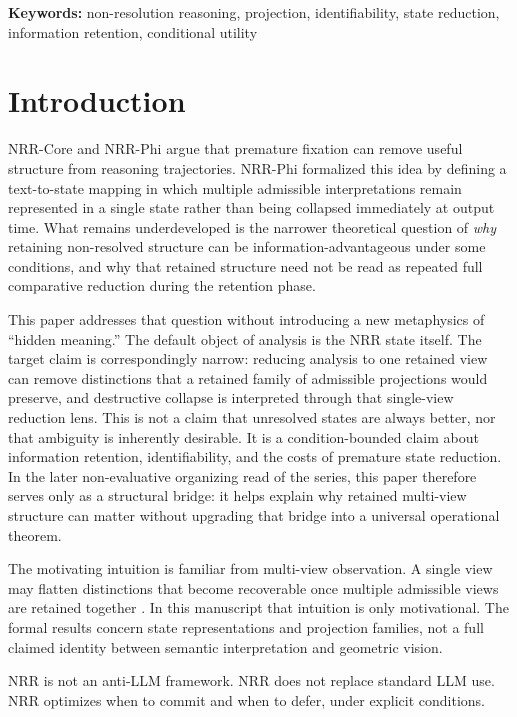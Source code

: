 \documentclass[11pt,a4paper]{article}
\begin{document}
\noindent\textbf{Keywords:} non-resolution reasoning, projection, identifiability, state reduction, information retention, conditional utility

\section{Introduction}
\label{sec:intro}

NRR-Core \cite{saito2025nrr} and NRR-Phi \cite{saito2026phi} argue that premature fixation can remove useful structure from reasoning trajectories. NRR-Phi \cite{saito2026phi} formalized this idea by defining a text-to-state mapping in which multiple admissible interpretations remain represented in a single state rather than being collapsed immediately at output time. What remains underdeveloped is the narrower theoretical question of \emph{why} retaining non-resolved structure can be information-advantageous under some conditions, and why that retained structure need not be read as repeated full comparative reduction during the retention phase.

This paper addresses that question without introducing a new metaphysics of ``hidden meaning.'' The default object of analysis is the NRR state itself. The target claim is correspondingly narrow: reducing analysis to one retained view can remove distinctions that a retained family of admissible projections would preserve, and destructive collapse is interpreted through that single-view reduction lens. This is not a claim that unresolved states are always better, nor that ambiguity is inherently desirable. It is a condition-bounded claim about information retention, identifiability, and the costs of premature state reduction. In the later non-evaluative organizing read of the series, this paper therefore serves only as a structural bridge: it helps explain why retained multi-view structure can matter without upgrading that bridge into a universal operational theorem.

The motivating intuition is familiar from multi-view observation. A single view may flatten distinctions that become recoverable once multiple admissible views are retained together \cite{hartley2004multiple}. In this manuscript that intuition is only motivational. The formal results concern state representations and projection families, not a full claimed identity between semantic interpretation and geometric vision.

NRR is not an anti-LLM framework.
NRR does not replace standard LLM use.
NRR optimizes when to commit and when to defer, under explicit conditions.
\end{document}
